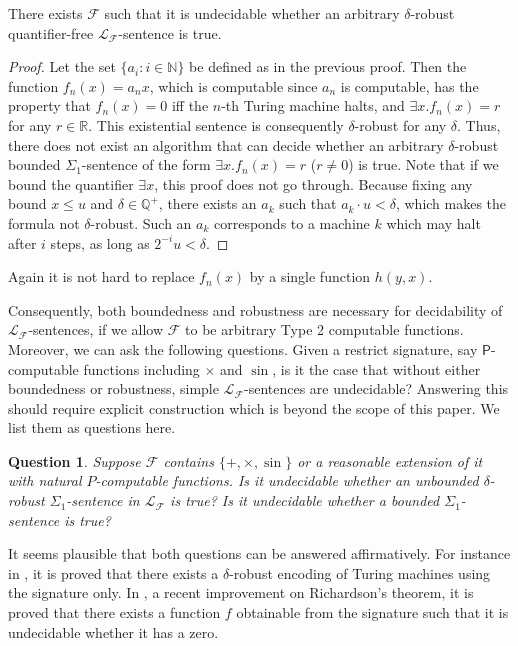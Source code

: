 \documentclass[prodmode]{acmsmall} %
\newtheorem{question}[theorem]{Question}
\begin{document}
\begin{proposition}
There exists $\mathcal{F}$ such that it is undecidable whether an arbitrary $\delta$-robust quantifier-free $\mathcal{L}_{\mathcal{F}}$-sentence is true. 
\end{proposition}

\begin{proof}
Let the set $\{a_i: i\in \mathbb{N}\}$ be defined as in the previous proof. Then the function $f_n(x) = a_nx$, which is computable since $a_n$ is computable, has the property that $f_n(x) = 0$ iff the $n$-th Turing machine halts, and $\exists x. f_n(x) = r$ for any $r\in \mathbb{R}$. This existential sentence is consequently $\delta$-robust for any $\delta$. Thus, there does not exist an algorithm that can decide whether an arbitrary $\delta$-robust bounded $\Sigma_1$-sentence of the form $\exists x. f_n(x)=r$ ($r\neq 0$) is true. Note that if we bound the quantifier $\exists x$, this proof does not go through. Because fixing any bound $x\leq u$ and $\delta\in \mathbb{Q}^+$, there exists an $a_k$ such that $a_k\cdot u<\delta$, which makes the formula not $\delta$-robust. Such an $a_k$ corresponds to a machine $k$ which may halt after $i$ steps, as long as $2^{-i}u<\delta$. 
\end{proof}

Again it is not hard to replace $f_n(x)$ by a single function $h(y,x)$.

Consequently, both boundedness and robustness are necessary for decidability of $\mathcal{L}_\mathcal{F}$-sentences, if we allow $\mathcal{F}$ to be arbitrary Type 2 computable functions. Moreover, we can ask the following questions. Given a restrict signature, say $\mathsf{P}$-computable functions including $\times$ and $\sin$, is it the case that without either boundedness or robustness, simple $\mathcal{L}_{\mathcal{F}}$-sentences are undecidable? Answering this should require explicit construction which is beyond the scope of this paper. We list them as questions here. 

\begin{question}
Suppose $\mathcal{F}$ contains $\{+,\times, \sin\}$ or a reasonable extension of it with natural $P$-computable functions. Is it undecidable whether an unbounded $\delta$-robust $\Sigma_1$-sentence in $\mathcal{L}_{\mathcal{F}}$ is true? Is it undecidable whether a bounded $\Sigma_1$-sentence is true?
\end{question}

It seems plausible that both questions can be answered affirmatively. For instance in \cite{Gra05robustsimulations}, it is proved that there exists a $\delta$-robust encoding of Turing machines using the signature only. In \cite{Laczkovich02theremoval}, a recent improvement on Richardson's theorem, it is proved that there exists a function $f$ obtainable from the signature such that it is undecidable whether it has a zero. 
\end{document}
